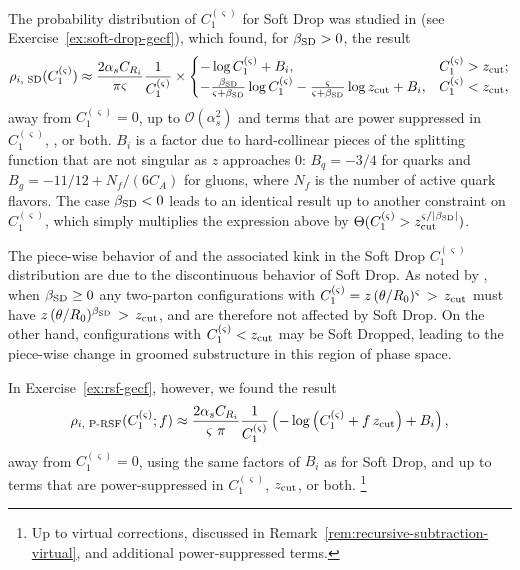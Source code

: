 The probability distribution of \(C_1^{(\varsigma)}\) for Soft Drop was studied in  (see Exercise~\ref{ex:soft-drop-gecf}), which found, for \(\beta_{\rm SD} > 0\), the  result
\begin{align}
    \label{eq:sd_lo}
    \rho_{i,\,\,\text{SD}}(C_1^{(\varsigma)})
    \approx
    \frac{2\alpha_s C_{R_i}}{\pi \varsigma} \frac{1}{C_1^{(\varsigma)}}
    \times
    \begin{cases}
        -\log C_1^{(\varsigma)} + B_i,
        &
        C_1^{(\varsigma)} > \zcut;
        \\
        -
        \frac{\beta_{\rm SD}}{\varsigma+\beta_{\rm SD}} \log C_1^{(\varsigma)}
        -
        \frac{\varsigma}{\varsigma+\beta_{\rm SD}}\log \zcut
        +
        B_i,
        &
        C_1^{(\varsigma)} < \zcut,
    \end{cases}
\end{align}
away from \(C_1^{(\varsigma)} = 0\), up to \(\mathcal{O}(\alpha_s^2)\) and terms that are power suppressed in \(C_1^{(\varsigma)}\), \zcut, or both.
%
\(B_i\) is a factor due to hard-collinear pieces of the splitting function that are not singular as \(z\) approaches 0:
%
$B_q = -3/4$ for quarks and $B_g = -11/12+N_f/(6 C_A)$ for gluons, where $N_f$ is the number of active quark flavors.
%
The case \(\beta_{\rm SD} < 0\) leads to an identical result up to another constraint on \(C_1^{(\varsigma)}\), which simply multiplies the expression above by \(\Theta(C_1^{(\varsigma)} > z_{\rm cut}^{\varsigma/ |\beta_{\rm SD}|})\).

The piece-wise behavior of  and the associated kink in the Soft Drop \(C_1^{(\varsigma)}\) distribution are due to the discontinuous behavior of Soft Drop.
%
As noted by , when \(\beta_{\rm SD} \geq 0\) any two-parton configurations with \(C_1^{(\varsigma)} = z \, (\theta/R_0)^\varsigma \, > \, z_{\rm cut}\) must have \(z \, (\theta/R_0)^{\beta_{\rm SD}} \, > \, z_{\rm cut}\), and are therefore not affected by Soft Drop.
%
On the other hand, configurations with \(C_1^{(\varsigma)} < z_{\rm cut}\) may be Soft Dropped, leading to the piece-wise change in groomed substructure in this region of phase space.

In Exercise~\ref{ex:rsf-gecf}, however, we found the  result
\begin{equation}
    \rho_{i,\,\,\text{P-RSF}}(C_1^{(\varsigma)}; f)
    \approx
    \frac{2\alpha_s C_{R_i}}{\varsigma~\pi}
    \frac{1}{C_1^{(\varsigma)}}
    \left(
        -\log\left(C_1^{(\varsigma)} + f\,\zcut\right)
        + B_i
    \right),
    \label{eq:prsf_NLO}
\end{equation}
away from \(C_1^{(\varsigma)} = 0\), using the same factors of \(B_i\) as for Soft Drop, and up to terms that are power-suppressed in \(C_1^{(\varsigma)}\), \(z_{\rm cut}\), or both.%
\footnote{
    Up to virtual corrections, discussed in Remark~\ref{rem:recursive-subtraction-virtual}, and additional power-suppressed terms.
}

